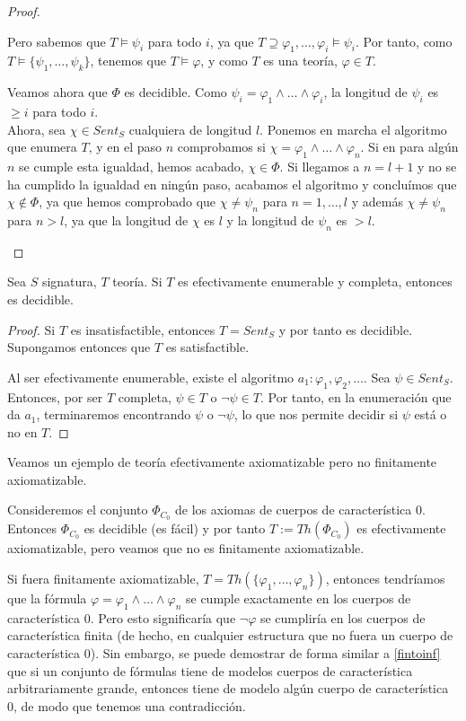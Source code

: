 \begin{proof}
\begin{itemize}
\begin{itemize}
        Pero sabemos que $T\vDash\psi_i$ para todo $i$, ya que $T\supseteq\varphi_1,\dots,\varphi_i\vDash\psi_i$. Por tanto, como $T\vDash\{\psi_1,\dots,\psi_k\}$, tenemos que $T\vDash\varphi$, y como  $T$ es una teoría, $\varphi\in T$.
    \end{itemize}
    Veamos ahora que $\Phi$ es decidible. Como $\psi_i=\varphi_1\land\dots\land\varphi_i$, la longitud de $\psi_i$ es $\geq i$ para todo $i$.\\
    
    Ahora, sea $\chi\in Sent_S$ cualquiera de longitud $l$. Ponemos en marcha el algoritmo que enumera $T$, y en el paso $n$ comprobamos si $\chi=\varphi_1\land\dots\land\varphi_n$. Si en para algún $n$ se cumple esta igualdad, hemos acabado, $\chi\in\Phi$. Si llegamos a $n=l+1$ y no se ha cumplido la igualdad en ningún paso, acabamos el algoritmo y concluímos que $\chi\notin\Phi$, ya que hemos comprobado que $\chi\neq\psi_n$ para $n=1,\dots,l$ y además $\chi\neq\psi_n$ para $n>l$, ya que la longitud de $\chi$ es $l$ y la longitud de $\psi_n$ es $>l$.
\end{itemize}
\end{proof}

\begin{prop*}
Sea $S$ signatura, $T$ teoría. Si $T$ es efectivamente enumerable y completa, entonces es decidible.
\end{prop*}
\begin{proof}
Si $T$ es insatisfactible, entonces $T = Sent_S$ y por tanto es decidible. Supongamos entonces que $T$ es satisfactible.

Al ser efectivamente enumerable, existe el algoritmo $a_1: \varphi_1, \varphi_2, \dots$. Sea $\psi \in Sent_S$. Entonces, por ser $T$ completa, $\psi \in T$ o $\neg\psi \in T$. Por tanto, en la enumeración que da $a_1$, terminaremos encontrando $\psi$ o $\neg \psi$, lo que nos permite decidir si $\psi$ está o no en $T$.
\end{proof}

\begin{example}
Veamos un ejemplo de teoría efectivamente axiomatizable pero no finitamente axiomatizable.

Consideremos el conjunto $\Phi_{C_0}$ de los axiomas de cuerpos de característica 0. Entonces $\Phi_{C_0}$ es decidible (es fácil) y por tanto $T := Th(\Phi_{C_0})$ es efectivamente axiomatizable, pero veamos que no es finitamente axiomatizable.

Si fuera finitamente axiomatizable, $T=Th(\{\varphi_1,\dots,\varphi_n\})$, entonces tendríamos que la fórmula $\varphi=\varphi_1\land\dots\land\varphi_n$ se cumple exactamente en los cuerpos de característica 0. Pero esto significaría que $\neg\varphi$ se cumpliría en los cuerpos de característica finita (de hecho, en cualquier estructura que no fuera un cuerpo de característica 0). Sin embargo, se puede demostrar de forma similar a \ref{fintoinf} que si un conjunto de fórmulas tiene de modelos cuerpos de característica arbitrariamente grande, entonces tiene de modelo algún cuerpo de característica 0, de modo que tenemos una contradicción.
\end{example}

